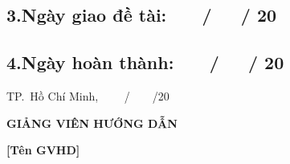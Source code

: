 \subsection*{\textnormal{3.\quad Ngày giao đề tài:} \textnormal{~~~/~~~/ 20~~~~}}

\subsection*{\textnormal{4.\quad Ngày hoàn thành:} \textnormal{~~~/~~~/ 20~~~~}}

\vspace{1.5cm}
\hspace{9cm} TP.~Hồ Chí Minh, ~~~~/~~~~/20~~~~

\vspace{0.5cm}
\hspace{9.5cm} \textbf{GIẢNG VIÊN HƯỚNG DẪN}

\vspace{2cm}
\hspace{10cm} \textbf{[Tên GVHD]}

\cleardoublepage

